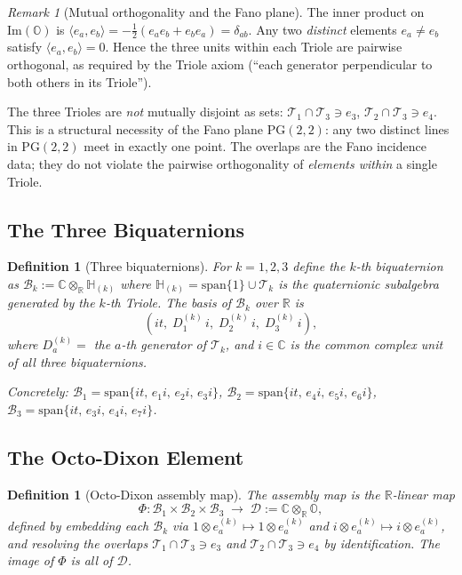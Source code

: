 \documentclass[12pt,a4paper]{article}
\newtheorem{definition}[theorem]{Definition}
\theoremstyle{remark}
\newtheorem*{remark}{Remark}
\begin{document}
\begin{remark}[Mutual orthogonality and the Fano plane]
The inner product on $\mathrm{Im}(\mathbb{O})$ is
$\langle e_a,e_b\rangle=-\tfrac{1}{2}(e_ae_b+e_be_a)=\delta_{ab}$.
Any two \emph{distinct} elements $e_a\neq e_b$ satisfy $\langle e_a,e_b\rangle=0$.
Hence the three units within each Triole are pairwise orthogonal,
as required by the Triole axiom (``each generator perpendicular to both others
in its Triole'').

The three Trioles are \emph{not} mutually disjoint as sets:
$\mathcal{T}_1\cap\mathcal{T}_3\ni e_3$, $\mathcal{T}_2\cap\mathcal{T}_3\ni e_4$.
This is a structural necessity of the Fano plane $\mathrm{PG}(2,2)$:
any two distinct lines in $\mathrm{PG}(2,2)$ meet in exactly one point.
The overlaps are the Fano incidence data; they do not violate the
pairwise orthogonality of \emph{elements within} a single Triole.
\end{remark}

\subsection*{The Three Biquaternions}

\begin{definition}[Three biquaternions]\label{def:three_biquaternions}
For $k=1,2,3$ define the \emph{$k$-th biquaternion} as
$\mathcal{B}_k:=\mathbb{C}\otimes_{\mathbb{R}}\mathbb{H}_{(k)}$
where $\mathbb{H}_{(k)}=\mathrm{span}\{1\}\cup\mathcal{T}_k$
is the quaternionic subalgebra generated by the $k$-th Triole.
The basis of $\mathcal{B}_k$ over $\mathbb{R}$ is
\[
  (it,\;D_1^{(k)}\,i,\;D_2^{(k)}\,i,\;D_3^{(k)}\,i),
\]
where $D_a^{(k)}=$ the $a$-th generator of $\mathcal{T}_k$,
and $i\in\mathbb{C}$ is the common complex unit of all three biquaternions.

Concretely:
$\mathcal{B}_1=\mathrm{span}\{it,\,e_1 i,\,e_2 i,\,e_3 i\}$,
$\mathcal{B}_2=\mathrm{span}\{it,\,e_4 i,\,e_5 i,\,e_6 i\}$,
$\mathcal{B}_3=\mathrm{span}\{it,\,e_3 i,\,e_4 i,\,e_7 i\}$.
\end{definition}

\subsection*{The Octo-Dixon Element}

\begin{definition}[Octo-Dixon assembly map]\label{def:assembly}
The \emph{assembly map} is the $\mathbb{R}$-linear map
\[
  \Phi:\mathcal{B}_1\times\mathcal{B}_2\times\mathcal{B}_3
  \;\longrightarrow\;
  \mathcal{D}:=\mathbb{C}\otimes_{\mathbb{R}}\mathbb{O},
\]
defined by embedding each $\mathcal{B}_k$ via
$1\otimes e_a^{(k)}\mapsto 1\otimes e_a^{(k)}$ and
$i\otimes e_a^{(k)}\mapsto i\otimes e_a^{(k)}$,
and resolving the overlaps $\mathcal{T}_1\cap\mathcal{T}_3\ni e_3$
and $\mathcal{T}_2\cap\mathcal{T}_3\ni e_4$ by identification.
The image of $\Phi$ is all of $\mathcal{D}$.
\end{definition}
\end{document}
